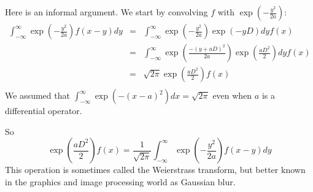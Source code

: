\documentclass[a4paper]{article}
\theoremstyle{definition}
\begin{document}
Here is an informal argument.
We start by convolving $f$ with $\exp(-\frac{y^2}{2a})$:
\begin{eqnarray*}
\int_{-\infty}^\infty\exp(-\frac{y^2}{2a}) f(x-y) dy
& = & \int_{-\infty}^\infty\exp(-\frac{y^2}{2a})\exp(-yD) dy f(x) \\
& = & \int_{-\infty}^\infty\exp(\frac{-(y+aD)^2}{2a})\exp(\frac{aD^2}{2}) dy f(x) \\
& = & \sqrt{2\pi}\exp(\frac{aD^2}{2}) f(x) \\
\end{eqnarray*}
We assumed that $\int_{-\infty}^\infty\exp(-(x-a)^2)dx = \sqrt{2\pi}$ even when $a$ is a differential operator.

So
\[
\exp{(\frac{aD^2}{2})}f(x) = \frac{1}{\sqrt{2\pi}}\int_{-\infty}^\infty\exp(-\frac{y^2}{2a}) f(x-y) dy 
\]
This operation is sometimes called the Weierstrass transform, but better known in the graphics and image processing world as Gaussian blur.
\end{document}
